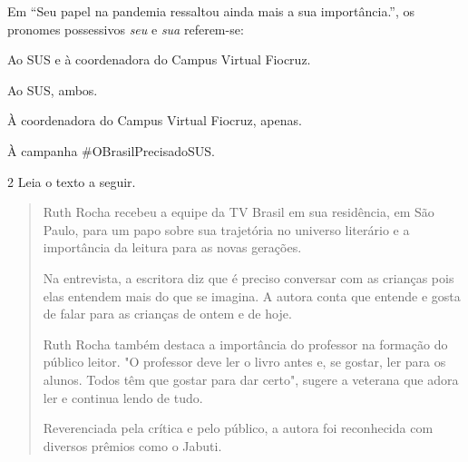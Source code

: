 \noindent Em ``Seu papel na pandemia ressaltou ainda mais a sua importância.'', os
pronomes possessivos \emph{seu} e \emph{sua} referem-se:

\begin{escolha}
\item Ao SUS e à coordenadora do Campus Virtual Fiocruz.
\item Ao SUS, ambos.
\item À coordenadora do Campus Virtual Fiocruz, apenas.
\item À campanha \#OBrasilPrecisadoSUS.
\end{escolha}



\num{2} Leia o texto a seguir.

\begin{quote}
\noindent Ruth Rocha recebeu a equipe da TV Brasil em sua residência, em São
Paulo, para um papo sobre sua trajetória no universo literário e a
importância da leitura para as novas gerações.

Na entrevista, a escritora diz que é preciso conversar com as crianças
pois elas entendem mais do que se imagina. A autora conta que entende e
gosta de falar para as crianças de ontem e de hoje.

Ruth Rocha também destaca a importância do professor na formação do
público leitor. "O professor deve ler o livro antes e, se gostar, ler
para os alunos. Todos têm que gostar para dar certo", sugere a veterana
que adora ler e continua lendo de tudo.

Reverenciada pela crítica e pelo público, a autora foi reconhecida com
diversos prêmios como o Jabuti.

\end{quote}

